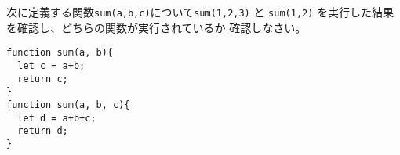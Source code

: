 \begin{Prob}\upshape
 次に定義する関数\texttt{sum(a,b,c)}について\Verb+sum(1,2,3)+ と
 \Verb+sum(1,2)+ を実行した結果を確認し、どちらの関数が実行されているか
 確認しなさい。
\begin{Verbatim}
function sum(a, b){
  let c = a+b;
  return c;
}
function sum(a, b, c){
  let d = a+b+c;
  return d;
}
\end{Verbatim}
\end{Prob}
